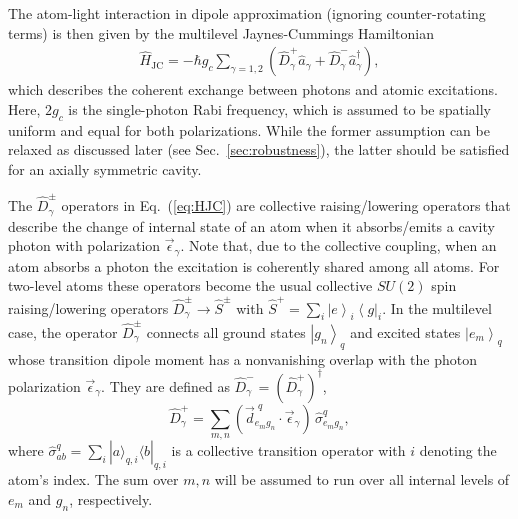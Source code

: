 \documentclass[aps,prx,superscriptaddress,twocolumn,notitlepage,nofootinbib,longbibliography]{revtex4-2}
\newcommand{\bra}[1]{\left<#1\right|}
\newcommand{\ket}[1]{\left|#1\right>}
\newcommand{\qusub}{q}
\begin{document}
The atom-light interaction in dipole approximation (ignoring counter-rotating terms) is then given by the multilevel Jaynes-Cummings Hamiltonian
\begin{align}
	\hat{H}_\text{JC}= - \hbar g_c\sum_{\gamma=1,2} ( \hat{D}^+_\gamma \hat{a}_\gamma + \hat{D}^-_\gamma \hat{a}^\dagger_\gamma ),
\label{eq:HJC}
\end{align}
which describes the coherent exchange between photons and atomic excitations.
Here, $2g_c$ is the single-photon Rabi frequency, which is assumed to be spatially uniform and  equal for both polarizations. While the former assumption can be relaxed as discussed later (see Sec.~\ref{sec:robustness}), the latter should be satisfied for an axially symmetric cavity.


The $\hat{D}^\pm_\gamma$ operators in Eq.~(\ref{eq:HJC}) are collective raising/lowering operators that describe the change of internal state of an atom when it absorbs/emits a cavity photon with polarization $\vec{\epsilon}_\gamma$.
Note that, due to the collective coupling, when an atom absorbs a photon the excitation is coherently shared among all atoms.
For two-level atoms these operators become the usual collective $SU(2)$ spin raising/lowering operators $\hat{D}^\pm_\gamma \rightarrow \hat{S}^\pm$ with $\hat{S}^+ = \sum_i \ket{e}_i \bra{g}_i$.
In the multilevel case, the operator $\hat{D}^\pm_\gamma$ connects all ground states $\ket{g_n}_{\qusub}$ and excited states $\ket{e_m}_{\qusub}$ whose transition dipole moment has a nonvanishing overlap with the photon polarization $\vec{\epsilon}_\gamma$. They are defined as $\hat{D}^-_\gamma = (\hat{D}^+_\gamma)^\dagger$,
\begin{equation}
	\hat{D}^+_\gamma = \sum_{m,n} (\vec{d}^{\,\,\qusub}_{e_mg_n} \cdot \vec{\epsilon}_\gamma )\, \hat{\sigma}^{\qusub}_{e_mg_n},
\label{eq:Dop_general}
\end{equation}
where $\hat{\sigma}^{\qusub}_{ab}=\sum_i | a \rangle_{\qusub,i}\langle b |_{\qusub,i}$ is a collective transition operator with $i$ denoting the atom's index.
The sum over $m,n$ will be assumed to run over all internal levels of $e_m$ and $g_n$, respectively.
\end{document}
